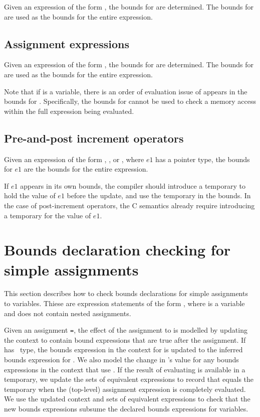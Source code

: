 Given an expression of the form  \code{,} , the
bounds for  are determined. The bounds for  are used
as the bounds for the entire expression.  

\subsection{Assignment expressions}

Given an expression of the form  \code{ = } , the
bounds for  are determined. The bounds for  are used
as the bounds for the entire expression.

Note that if  is a variable,
there is an order of evaluation issue of  appears in the bounds for
.   Specifically, the bounds for  cannot be used to
check a memory access within the full expression being evaluated.

\subsection{Pre-and-post increment operators}
\label{section:inferring-increment-bounds}

Given an expression of the form \code{++}, \code{--},
 \code{++} or \code{--}, where $e1$ has a pointer type,
 the bounds for $e1$ are the bounds for the entire expression.
 
 If $e1$ appears in its own bounds, the compiler should introduce a
 temporary to hold the value of $e1$ before the update, and use
 the temporary in the bounds.  In the case of post-increment operators, 
 the C semantics already require  introducing a temporary for the value of $e1$.

\section{Bounds declaration checking for simple assignments}
\label{section:checking-simple-assignment}

This section describes how to check bounds declarations for
simple assignments to variables.  Thiese are expression statements of the
form , where  is a variable and  does
not contain nested assignments.

Given an assignment \lstinline+=+, the effect of the assignment to 
is modelled by updating the context to contain bound expressions that are true
after the assignment.  If  has \arrayptr\ type, the bounds expression in
the context for  is updated to the inferred bounds expression for .
We also model the change in 's
value for any bounds expressions in the context that use .   If the result of 
evaluating  is available in a temporary, we update the sets of equivalent
expressions to record that  equals the temporary when the (top-level) assignment
expression is completely evaluated.
We use the updated context and sets of equivalent expressions to check
that the new bounds expressions subsume the declared bounds expressions for variables.

